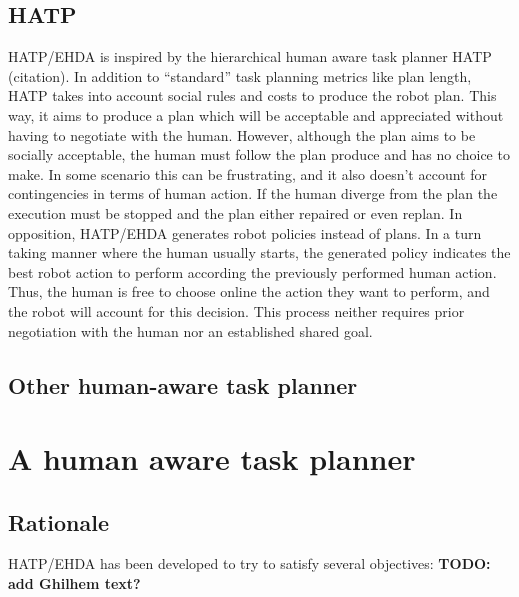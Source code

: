 \subsection{HATP}
HATP/EHDA is inspired by the hierarchical human aware task planner HATP (citation). In addition to ``standard'' task planning metrics like plan length, HATP takes into account social rules and costs to produce the robot plan. This way, it aims to produce a plan which will be acceptable and appreciated without having to negotiate with the human. However, although the plan aims to be socially acceptable, the human must follow the plan produce and has no choice to make. 
In some scenario this can be frustrating, and it also doesn't account for contingencies in terms of human action. If the human diverge from the plan the execution must be stopped and the plan either repaired or even replan. 
In opposition, HATP/EHDA generates robot policies instead of plans. In a turn taking manner where the human usually starts, the generated policy indicates the best robot action to perform according the previously performed human action. Thus, the human is free to choose online the action they want to perform, and the robot will account for this decision. This process neither requires prior negotiation with the human nor an established shared goal.  

\subsection{Other human-aware task planner}

\section{A human aware task planner}
\subsection{Rationale}

HATP/EHDA has been developed to try to satisfy several objectives: \textbf{TODO: add Ghilhem text?}

